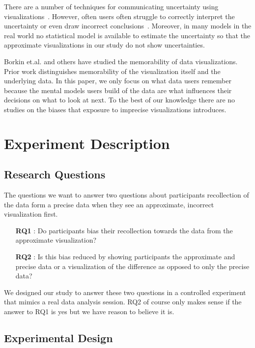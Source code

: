 \documentclass[10pt,journal,compsoc]{IEEEtran}
\begin{document}
There are a number of techniques for communicating uncertainty using visualizations~\cite{kay2016ish, olston2002visualizing}.
However, often users often struggle to correctly interpret the uncertainty or even draw incorrect conclusions~\cite{joslyn2013decisions}.
Moreover, in many models in the real world no statistical model is available to estimate the uncertainty so that the approximate visualizations in our study do not show uncertainties.

Borkin et.al. \cite{borkin2013makes} and others have studied the memorability of data visualizations.
Prior work distinguishes memorability of the visualization itself and the underlying data.
In this paper, we only focus on what data users remember because the mental models users build of the data are what influences their decisions on what to look at next.
To the best of our knowledge there are no studies on the biases that exposure to imprecise visualizations introduces.

\section{Experiment Description}\label{sec:experimental_setup}

\subsection{Research Questions}

The questions we want to answer two questions about participants recollection of the data form a precise data when they see an approximate, incorrect visualization first. 

\begin{enumerate}
  \item[\textbf{RQ1}]: Do participants bias their recollection towards the data from the approximate visualization?
  \item[\textbf{RQ2}]: Is this bias reduced by showing participants the approximate and precise data or a visualization of the difference as opposed to only the precise data?
\end{enumerate}

We designed our study to answer these two questions in a controlled experiment that mimics a real data analysis session.
RQ2 of course only makes sense if the answer to RQ1 is yes but we have reason to believe it is.

\subsection{Experimental Design}
\end{document}
